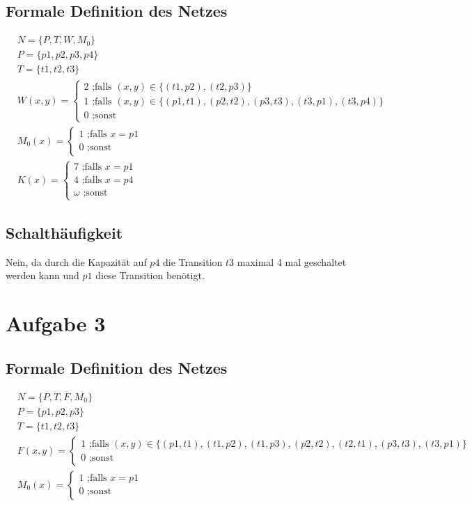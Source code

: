 \documentclass[10pt]{scrartcl}
\begin{document}
	\subsection{Formale Definition des Netzes}
	\begin{align}
	&N =\{P,T,W,M_0\}\\
	&P =\{p1,p2,p3,p4\}\\
	&T =\{t1,t2,t3\}\\
	&W(x,y) =\begin{cases}
			2 \text{ ;falls } (x,y) \in \{(t1,p2),(t2,p3)\} \\
			1 \text{ ;falls } (x,y) \in \{(p1,t1),(p2,t2), (p3,t3), (t3,p1), (t3,p4)\} \\
			0 \text{ ;sonst}
	     \end{cases}\\
	&M_0(x)=  \begin{cases}
			1 \text{ ;falls } x=p1\\
			0 \text{ ;sonst}
	     \end{cases}\\  
	&K(x)=  \begin{cases}
			7 \text{ ;falls } x=p1\\
			4 \text{ ;falls } x=p4\\
			\omega \text{ ;sonst}
	     \end{cases} 
	\end{align}	
	
	\subsection{Schalthäufigkeit}
	Nein, da durch die Kapazität auf $p4$ die Transition $t3$ maximal 4 mal geschaltet werden kann und $p1$ diese Transition benötigt. 

\section{Aufgabe 3}
\subsection{Formale Definition des Netzes}
	\begin{align}
	&N =\{P,T,F,M_0\}\\
	&P =\{p1,p2,p3\}\\
	&T =\{t1,t2,t3\}\\
	&F(x,y) =\begin{cases}
			1 \text{ ;falls } (x,y) \in \{(p1,t1),(t1,p2),(t1,p3),(p2,t2),(t2,t1),(p3,t3),(t3,p1)\} \\
			0 \text{ ;sonst}
	     \end{cases}\\	
	&M_0(x)=  \begin{cases}
			1 \text{ ;falls } x=p1\\
			0 \text{ ;sonst}
	     \end{cases}        
	\end{align}	
	
\end{document}
